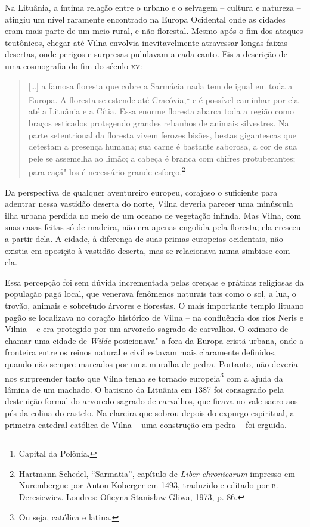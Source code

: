 Na Lituânia, a íntima relação entre o urbano e o selvagem -- cultura e
natureza -- atingiu um nível raramente encontrado na Europa Ocidental 
onde as cidades eram mais parte de um meio rural, e não florestal.
Mesmo após o fim dos ataques teutônicos, chegar até Vilna envolvia
inevitavelmente atravessar longas faixas desertas, onde perigos e
surpresas pululavam a cada canto. Eis a descrição de uma cosmografia do
fim do século \textsc{xv}:

\begin{quote}
[\ldots{}] a famosa floresta que cobre a Sarmácia nada tem de igual
em toda a Europa. A floresta se estende até Cracóvia,\footnote{Capital da
Polônia.} e é possível caminhar por ela até a Lituânia e a Cítia. Essa
enorme floresta abarca toda a região como braços esticados protegendo
grandes rebanhos de animais silvestres. Na parte setentrional da
floresta vivem ferozes bisões, bestas gigantescas que detestam a
presença humana; sua carne é bastante saborosa, a cor de sua pele se
assemelha ao limão; a cabeça é branca com chifres protuberantes; para
caçá"-los é necessário grande esforço.\footnote{Hartmann Schedel, ``Sarmatia'', capítulo de \textit{Liber chronicarum} impresso em Nurembergue por Anton Koberger em 1493, traduzido e editado por \textsc{b}.\,Deresiewicz. Londres: Oficyna Stanisław Gliwa, 1973, p. 86.} 
\end{quote}

Da perspectiva de qualquer aventureiro europeu, corajoso o suficiente
para adentrar nessa vastidão deserta do norte, Vilna deveria parecer uma
minúscula ilha urbana perdida no meio de um oceano de vegetação infinda.
Mas Vilna, com suas casas feitas só de madeira, não era apenas engolida
pela floresta; ela cresceu a partir dela. A cidade, à diferença de suas
primas europeias ocidentais, não existia em oposição à vastidão deserta,
mas se relacionava numa simbiose com ela.

Essa percepção foi sem dúvida incrementada pelas crenças e práticas
religiosas da população pagã local, que venerava fenômenos naturais tais
como o sol, a lua, o trovão, animais e sobretudo árvores e florestas. O
mais importante templo lituano pagão se localizava no coração histórico
de Vilna -- na confluência dos rios Neris e Vilnia -- e era protegido por
um arvoredo sagrado de carvalhos. O oxímoro de chamar uma cidade de
\textit{Wilde} posicionava"-a fora da Europa cristã urbana, onde a
fronteira entre os reinos natural e civil estavam mais claramente
definidos, quando não sempre marcados por uma muralha de pedra.
Portanto, não deveria nos surpreender tanto que Vilna tenha se tornado
europeia\footnote{Ou seja, católica e latina.} com a ajuda da lâmina de um
machado. O batismo da Lituânia em 1387 foi consagrado pela destruição
formal do arvoredo sagrado de carvalhos, que ficava no vale sacro aos
pés da colina do castelo. Na clareira que sobrou depois do expurgo
espiritual, a primeira catedral católica de Vilna -- uma construção em
pedra -- foi erguida.


